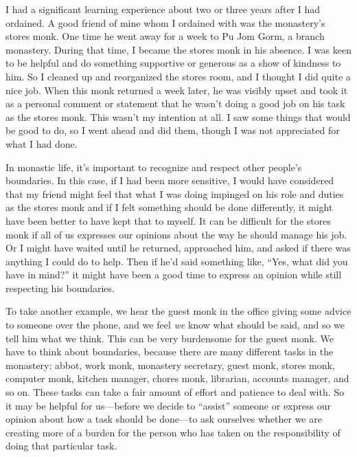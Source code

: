 
I had a significant learning experience about two or three years after 
I had ordained. A good friend of mine whom I ordained with was the 
monastery's stores monk. One time he went away for a week to Pu Jom 
Gorm, a branch monastery. During that time, I became the stores monk in 
his absence. I was keen to be helpful and do something supportive or 
generous as a show of kindness to him. So I cleaned up and reorganized 
the stores room, and I thought I did quite a nice job. When this monk 
returned a week later, he was visibly upset and took it as a personal 
comment or statement that he wasn't doing a good job on his task as the 
stores monk. This wasn't my intention at all. I saw some things that 
would be good to do, so I went ahead and did them, though I was not 
appreciated for what I had done.

In monastic life, it's important to recognize and respect other 
people's boundaries. In this case, if I had been more sensitive, I 
would have considered that my friend might feel that what I was doing 
impinged on his role and duties as the stores monk and if I felt 
something should be done differently, it might have been better to have 
kept that to myself. It can be difficult for the stores monk if all of 
us expresses our opinions about the way he should manage his job. Or I 
might have waited until he returned, approached him, and asked if there 
was anything I could do to help. Then if he'd said something like, 
``Yes, what did you have in mind?'' it might have been a good time to 
express an opinion while still respecting his boundaries.

To take another example, we hear the guest monk in the office giving 
some advice to someone over the phone, and we feel \emph{we} know what 
should be said, and so we tell him what we think. This can be very 
burdensome for the guest monk. We have to think about boundaries, 
because there are many different tasks in the monastery: abbot, work 
monk, monastery secretary, guest monk, stores monk, computer monk, 
kitchen manager, chores monk, librarian, accounts manager, and so on. 
These tasks can take a fair amount of effort and patience to deal with. 
So it may be helpful for us---before we decide to ``assist'' someone or 
express our opinion about how a task should be done---to ask ourselves 
whether we are creating more of a burden for the person who has taken 
on the responsibility of doing that particular task.

